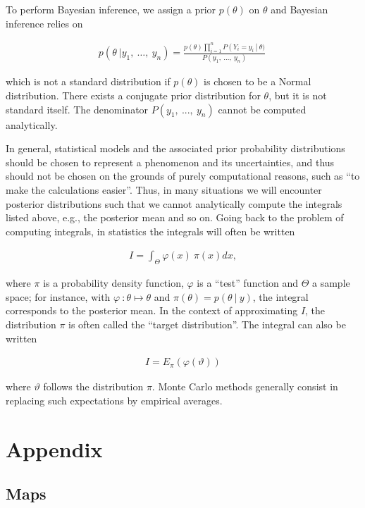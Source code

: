 \documentclass[11pt,a4paper]{article}
\begin{document}
To perform Bayesian inference, we assign a prior \(p(\theta)\) on
\(\theta\) and Bayesian inference relies on

\begin{align}p(\theta\ |y_{1},\ \ldots,\ y_{n}) = \frac{p(\theta)\prod_{i = 1}^{n}{P\left( Y_{i} = y_{i}\  \right|\ \theta)}}{P(y_{1},\ \ldots,\ y_{n})}\ \end{align}

which is not a standard distribution if \(p(\theta)\) is chosen to be a
Normal distribution. There exists a conjugate prior distribution for
\(\theta\), but it is not standard itself. The denominator
\(P(y_{1},\ ...,\ y_{n})\) cannot be computed analytically.

In general, statistical models and the associated prior probability
distributions should be chosen to represent a phenomenon and its
uncertainties, and thus should not be chosen on the grounds of purely
computational reasons, such as ``to make the calculations easier''.
Thus, in many situations we will encounter posterior distributions such
that we cannot analytically compute the integrals listed above, e.g.,
the posterior mean and so on. Going back to the problem of computing
integrals, in statistics the integrals will often be written

\begin{align}I = \int_{\Theta}^{}{\varphi(x)\ \pi(x)}dx,\end{align}

where \(\pi\) is a probability density function, \(\varphi\) is a
``test'' function and \(\Theta\) a sample space; for instance, with
\(\varphi\ :\theta \mapsto \theta\) and
\(\pi(\theta) = p(\theta\ |\ y)\), the integral corresponds to the
posterior mean. In the context of approximating \(I\), the distribution
\(\pi\) is often called the ``target distribution''. The integral can
also be written

\begin{align}I = E_{\pi}\left( \varphi(\vartheta) \right)\end{align}

where \(\vartheta\) follows the distribution \(\pi\). Monte Carlo
methods generally consist in replacing such expectations by empirical
averages.

\section{Appendix}

\subsection{Maps}
\end{document}
